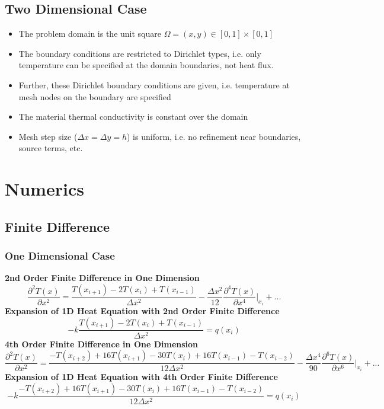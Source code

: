 \documentclass[letterpaper,12pt]{article}
\begin{document}
\subsection{Two Dimensional Case}
\begin{itemize}
\item The problem domain is the unit square $ \Omega = (x,y) \in [0, 1] \times [0,1]$
\item The boundary conditions are restricted to Dirichlet types, i.e. only temperature can be specified at the domain boundaries, not heat flux.
\item Further, these Dirichlet boundary conditions are given, i.e. temperature at mesh nodes on the boundary are specified
\item The material thermal conductivity is constant over the domain
\item Mesh step size ($\Delta x = \Delta y = h$) is uniform, i.e. no refinement near boundaries, source terms, etc.
\end{itemize}

\section{Numerics}
\subsection{Finite Difference}
\subsubsection{One Dimensional Case}
\textbf{2nd Order Finite Difference in One Dimension}
\begin{equation}
\label{1D2FD}
\frac{\partial^2 T(x)}{\partial x^2} = \frac{T(x_{i+1}) - 2  T(x_i) + T(x_{i-1})}{\Delta x^2} - \frac{\Delta x^2}{12} \frac{\partial ^4 T(x)}{\partial x^4} |_{x_i} + ...
\end{equation}
\textbf{Expansion of 1D Heat Equation with 2nd Order Finite Difference}
\begin{equation}
\label{heat1d2FD}
-k \frac{T(x_{i+1}) - 2  T(x_i) + T(x_{i-1})}{\Delta x^2} = q(x_i)
\end{equation}
\textbf{4th Order Finite Difference in One Dimension}
\begin{equation}
\label{1D4FD}
\frac{\partial^2 T(x)}{\partial x^2} = \frac{-T(x_{i+2}) + 16  T(x_{i+1}) - 30T(x_i) + 16 T(x_{i-1}) -T(x_{i-2})}{12 \Delta x^2} - \frac{\Delta x^4}{90} \frac{\partial ^6 T(x)}{\partial x^6} |_{x_i} + ...
\end{equation}
\textbf{Expansion of 1D Heat Equation with 4th Order Finite Difference}
\begin{equation}
\label{heat1d4FD}
-k \frac{-T(x_{i+2}) + 16  T(x_{i+1}) - 30T(x_i) + 16 T(x_{i-1}) -T(x_{i-2})}{12 \Delta x^2} = q(x_i)
\end{equation}
\end{document}
